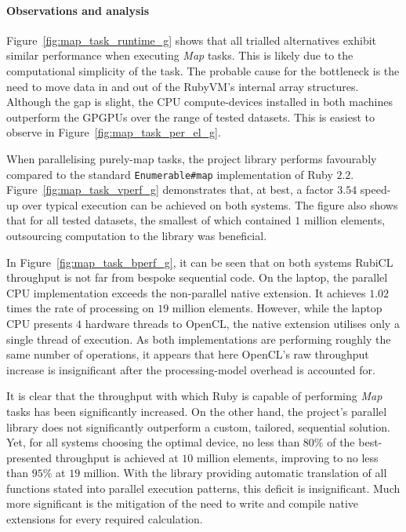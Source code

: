 \paragraph*{Observations and analysis}
Figure~\ref{fig:map_task_runtime_g} shows that all trialled alternatives exhibit similar performance when executing \emph{Map} tasks.
This is likely due to the computational simplicity of the task. The probable cause for the bottleneck is the need to move data in and out of the RubyVM's internal array structures.
Although the gap is slight, the \ac{CPU} compute-devices installed in both machines outperform the \acp{GPGPU} over the range of tested datasets. This is easiest to observe in Figure~\ref{fig:map_task_per_el_g}.

When parallelising purely-map tasks, the project library performs favourably compared to the standard \verb|Enumerable#map| implementation of Ruby $2.2$. Figure~\ref{fig:map_task_vperf_g} demonstrates that, at best, a factor $3.5$\textendash$4$ speed-up over typical execution can be achieved on both systems.
The figure also shows that for all tested datasets, the smallest of which contained $1$ million elements, outsourcing computation to the library was beneficial.

In Figure~\ref{fig:map_task_bperf_g}, it can be seen that on both systems RubiCL throughput is not far from bespoke sequential code. On the laptop, the parallel \ac{CPU} implementation exceeds the non-parallel native extension. It achieves $1.02$ times the rate of processing on $19$ million elements.
However, while the laptop \ac{CPU} presents $4$ hardware threads to \ac{OpenCL}, the native extension utilises only a single thread of execution. As both implementations are performing roughly the same number of operations, it appears that here \ac{OpenCL}'s raw throughput increase is insignificant after the processing-model overhead is accounted for.

It is clear that the throughput with which Ruby is capable of performing \emph{Map} tasks has been significantly increased.
On the other hand, the project's parallel library does not significantly outperform a custom, tailored, sequential solution.
Yet, for all systems choosing the optimal device, no less than $80\%$ of the best-presented throughput is achieved at $10$ million elements, improving to no less than $95\%$ at $19$ million.
With the library providing automatic translation of all functions stated into parallel execution patterns, this deficit is insignificant. Much more significant is the mitigation of the need to write and compile native extensions for every required calculation.

